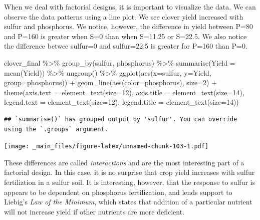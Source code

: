 \documentclass[
]{book}
\newenvironment{Shaded}{\begin{snugshade}}{\end{snugshade}}
\newcommand{\AttributeTok}[1]{\textcolor[rgb]{0.77,0.63,0.00}{#1}}
\newcommand{\DecValTok}[1]{\textcolor[rgb]{0.00,0.00,0.81}{#1}}
\newcommand{\FunctionTok}[1]{\textcolor[rgb]{0.00,0.00,0.00}{#1}}
\newcommand{\NormalTok}[1]{#1}
\newcommand{\SpecialCharTok}[1]{\textcolor[rgb]{0.00,0.00,0.00}{#1}}
\begin{document}
When we deal with factorial designs, it is important to visualize the data. We can observe the data patterns using a line plot. We see clover yield increased with sulfur and phosphorus. We notice, however, the difference in yield between P=80 and P=160 is greater when S=0 than when S=11.25 or S=22.5. We also notice the difference betwee sulfur=0 and sulfur=22.5 is greater for P=160 than P=0.

\begin{Shaded}
\begin{Highlighting}[]
\NormalTok{clover\_final }\SpecialCharTok{\%\textgreater{}\%}
  \FunctionTok{group\_by}\NormalTok{(sulfur, phosphorus) }\SpecialCharTok{\%\textgreater{}\%}
  \FunctionTok{summarise}\NormalTok{(}\AttributeTok{Yield =} \FunctionTok{mean}\NormalTok{(Yield)) }\SpecialCharTok{\%\textgreater{}\%}
  \FunctionTok{ungroup}\NormalTok{() }\SpecialCharTok{\%\textgreater{}\%}
  \FunctionTok{ggplot}\NormalTok{(}\FunctionTok{aes}\NormalTok{(}\AttributeTok{x=}\NormalTok{sulfur, }\AttributeTok{y=}\NormalTok{Yield, }\AttributeTok{group=}\NormalTok{phosphorus)) }\SpecialCharTok{+}
  \FunctionTok{geom\_line}\NormalTok{(}\FunctionTok{aes}\NormalTok{(}\AttributeTok{color=}\NormalTok{phosphorus), }\AttributeTok{size=}\DecValTok{2}\NormalTok{) }\SpecialCharTok{+}
  \FunctionTok{theme}\NormalTok{(}\AttributeTok{axis.text =} \FunctionTok{element\_text}\NormalTok{(}\AttributeTok{size=}\DecValTok{12}\NormalTok{),}
        \AttributeTok{axis.title =} \FunctionTok{element\_text}\NormalTok{(}\AttributeTok{size=}\DecValTok{14}\NormalTok{),}
        \AttributeTok{legend.text =} \FunctionTok{element\_text}\NormalTok{(}\AttributeTok{size=}\DecValTok{12}\NormalTok{),}
        \AttributeTok{legend.title =} \FunctionTok{element\_text}\NormalTok{(}\AttributeTok{size=}\DecValTok{14}\NormalTok{))}
\end{Highlighting}
\end{Shaded}

\begin{verbatim}
## `summarise()` has grouped output by 'sulfur'. You can override using the `.groups` argument.
\end{verbatim}

\texttt{[image: \_main\_files/figure-latex/unnamed-chunk-103-1.pdf]}

These differences are called \emph{interactions} and are the most interesting part of a factorial design. In this case, it is no surprise that crop yield increases with sulfur fertiliztion in a sulfur soil. It is interesting, however, that the response to sulfur is appears to be dependent on phosphorus fertilization, and lends support to Liebig's \emph{Law of the Minimum}, which states that addition of a particular nutrient will not increase yield if other nutrients are more deficient.
\end{document}
